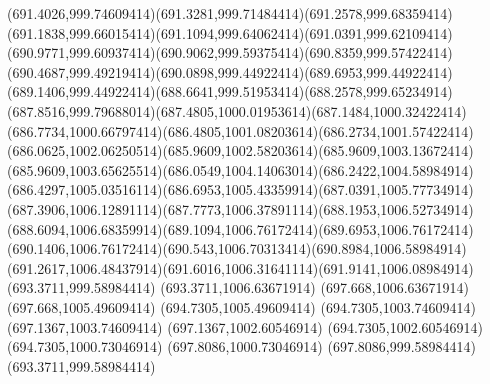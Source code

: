 {{	\curveto(691.4026,999.74609414)(691.3281,999.71484414)(691.2578,999.68359414)
	\curveto(691.1838,999.66015414)(691.1094,999.64062414)(691.0391,999.62109414)
	\curveto(690.9771,999.60937414)(690.9062,999.59375414)(690.8359,999.57422414)
	\curveto(690.4687,999.49219414)(690.0898,999.44922414)(689.6953,999.44922414)
	\curveto(689.1406,999.44922414)(688.6641,999.51953414)(688.2578,999.65234914)
	\curveto(687.8516,999.79688014)(687.4805,1000.01953614)(687.1484,1000.32422414)
	\curveto(686.7734,1000.66797414)(686.4805,1001.08203614)(686.2734,1001.57422414)
	\curveto(686.0625,1002.06250514)(685.9609,1002.58203614)(685.9609,1003.13672414)
	\curveto(685.9609,1003.65625514)(686.0549,1004.14063014)(686.2422,1004.58984914)
	\curveto(686.4297,1005.03516114)(686.6953,1005.43359914)(687.0391,1005.77734914)
	\curveto(687.3906,1006.12891114)(687.7773,1006.37891114)(688.1953,1006.52734914)
	\curveto(688.6094,1006.68359914)(689.1094,1006.76172414)(689.6953,1006.76172414)
	\curveto(690.1406,1006.76172414)(690.543,1006.70313414)(690.8984,1006.58984914)
	\curveto(691.2617,1006.48437914)(691.6016,1006.31641114)(691.9141,1006.08984914)
	\closepath
	\moveto(693.3711,999.58984414)
	\lineto(693.3711,1006.63671914)
	\lineto(697.668,1006.63671914)
	\lineto(697.668,1005.49609414)
	\lineto(694.7305,1005.49609414)
	\lineto(694.7305,1003.74609414)
	\lineto(697.1367,1003.74609414)
	\lineto(697.1367,1002.60546914)
	\lineto(694.7305,1002.60546914)
	\lineto(694.7305,1000.73046914)
	\lineto(697.8086,1000.73046914)
	\lineto(697.8086,999.58984414)
	\closepath
	\moveto(693.3711,999.58984414)
}
}

